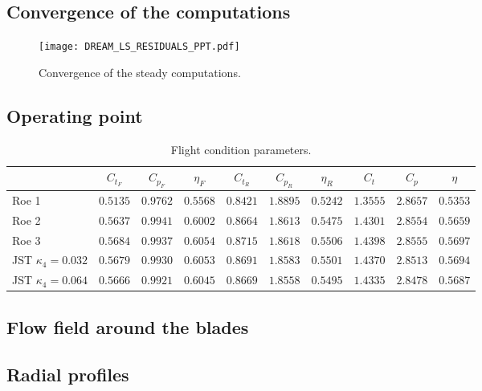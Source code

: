
\subsection{Convergence of the computations} %
\label{sub:dream_convergence}

\begin{figure}[htb]
  \centering
  \texttt{[image: DREAM\_LS\_RESIDUALS\_PPT.pdf]}
  \caption{Convergence of the steady computations.}
  \label{fig:dream_operating_point}
\end{figure}

\subsection{Operating point} %
\label{sub:dream_operating_point}

\begin{table}[htb]
   \centering
  \begin{tabular}{l|ccccccccc}
    \toprule
    \phantom{abdefghijk}& $C_{t_F}$ & $C_{p_F}$ & $\eta_F$ & $C_{t_R}$ & $C_{p_R}$ & $\eta_R$ & $C_t$ & $C_p$ & $\eta$ \\
    \midrule
    Roe 1 & $0.5135$ & $0.9762$ & $0.5568$ & $0.8421$ & $1.8895$ & $0.5242$ & $1.3555$ & $2.8657$ & $0.5353$ \\
    Roe 2 & $0.5637$ & $0.9941$ & $0.6002$ & $0.8664$ & $1.8613$ & $0.5475$ & $1.4301$ & $2.8554$ & $0.5659$ \\
    Roe 3 & $0.5684$ & $0.9937$ & $0.6054$ & $0.8715$ & $1.8618$ & $0.5506$ & $1.4398$ & $2.8555$ & $0.5697$ \\
    JST $\kappa_4 = 0.032$ & $0.5679$ & $0.9930$ & $0.6053$ & $0.8691$ & $1.8583$ & $0.5501$ & $1.4370$ & $2.8513$ & $0.5694$ \\
    JST $\kappa_4 = 0.064$ & $0.5666$ & $0.9921$ & $0.6045$ & $0.8669$ & $1.8558$ & $0.5495$ & $1.4335$ & $2.8478$ & $0.5687$ \\
    \bottomrule
  \end{tabular}
  \caption{Flight condition parameters.}
  \label{tab:dream_operating_point}
\end{table} 

\subsection{Flow field around the blades} %
\label{sub:dream_flow_field}

\subsection{Radial profiles} %
\label{sub:dream_radial_profiles}